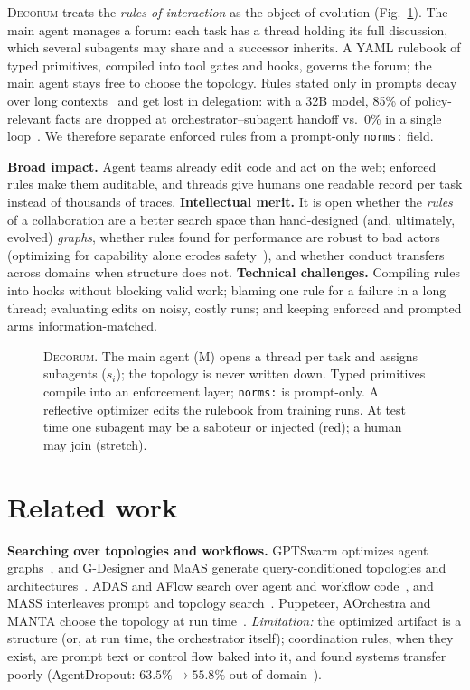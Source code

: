 \documentclass{article}
\newcommand{\dec}{\textsc{Decorum}}
\begin{document}
\dec{} treats the \emph{rules of interaction} as the object of evolution (Fig.~\ref{fig:decorum}).
The main agent manages a forum: each task has a thread holding its full discussion, which several subagents may share and a successor inherits. A YAML rulebook of typed primitives, compiled into tool gates and hooks, governs the forum; the main agent stays free to choose the topology.
Rules stated only in prompts decay over long contexts~\citep{gamage2026omission} and get lost in delegation: with a 32B model, 85\% of policy-relevant facts are dropped at orchestrator--subagent handoff vs.\ 0\% in a single loop~\citep{li2026governance}.
We therefore separate enforced rules from a prompt-only \texttt{norms:} field.

\textbf{Broad impact.} Agent teams already edit code and act on the web; enforced rules make them auditable, and threads give humans one readable record per task instead of thousands of traces.
\textbf{Intellectual merit.} It is open whether the \emph{rules} of a collaboration are a better search space than hand-designed (and, ultimately, evolved) \emph{graphs}, whether rules found for performance are robust to bad actors (optimizing for capability alone erodes safety~\citep{shao2026your,rosser2025agentbreeder}), and whether conduct transfers across domains when structure does not.
\textbf{Technical challenges.} Compiling rules into hooks without blocking valid work; blaming one rule for a failure in a long thread; evaluating edits on noisy, costly runs; and keeping enforced and prompted arms information-matched.

\begin{figure}[t]
\centering
\resizebox{0.8\linewidth}{!}{}
\caption{\dec. The main agent (M) opens a thread per task and assigns subagents ($s_i$); the topology is never written down. Typed primitives compile into an enforcement layer; \texttt{norms:} is prompt-only. A reflective optimizer edits the rulebook from training runs. At test time one subagent may be a saboteur or injected (red); a human may join (stretch).}
\label{fig:decorum}
\end{figure}

\section{Related work}

\textbf{Searching over topologies and workflows.}
GPTSwarm optimizes agent graphs~\citep{zhuge2024gptswarm}, and G-Designer and MaAS generate query-conditioned topologies and architectures~\citep{zhang2025gdesigner,zhang2025multi}.
ADAS and AFlow search over agent and workflow code~\citep{hu2025automated,zhang2025aflow}, and MASS interleaves prompt and topology search~\citep{zhou2026multi}.
Puppeteer, AOrchestra and MANTA choose the topology at run time~\citep{dang2025multi,ruan2026aorchestra,huang2026manta}.
\emph{Limitation:} the optimized artifact is a structure (or, at run time, the orchestrator itself); coordination rules, when they exist, are prompt text or control flow baked into it, and found systems transfer poorly (AgentDropout: $63.5\%\rightarrow55.8\%$ out of domain~\citep{so2026superficial}).
\end{document}
